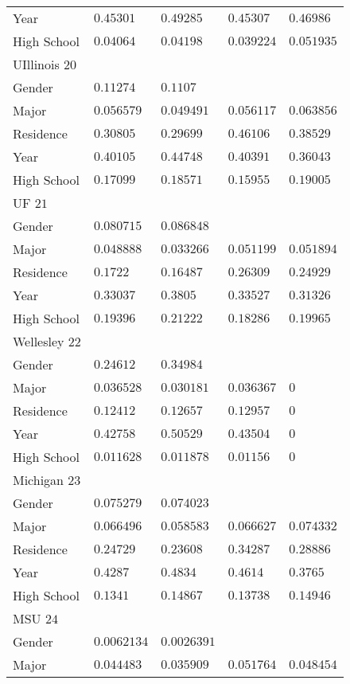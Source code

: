 \begin{center}
\begin{longtable}{|l|l|l|l|l|}
Year & $0.45301$ & $0.49285$ & $0.45307$ & $0.46986$ \\
High School & $0.04064$ & $0.04198$ & $0.039224$ & $0.051935$ \\ \hline \hline
UIllinois $20$ & & &   \\ \hline
Gender & $0.11274$ & $0.1107$ & & \\
Major & $0.056579$ & $0.049491$ & $0.056117$ & $0.063856$ \\
Residence & $0.30805$ & $0.29699$ & $0.46106$ & $0.38529$ \\
Year & $0.40105$ & $0.44748$ & $0.40391$ & $0.36043$ \\
High School & $0.17099$ & $0.18571$ & $0.15955$ & $0.19005$ \\ \hline \hline
UF $21$ & & &   \\ \hline
Gender & $0.080715$ & $0.086848$ & & \\
Major & $0.048888$ & $0.033266$ & $0.051199$ & $0.051894$ \\
Residence & $0.1722$ & $0.16487$ & $0.26309$ & $0.24929$ \\
Year & $0.33037$ & $0.3805$ & $0.33527$ & $0.31326$ \\
High School & $0.19396$ & $0.21222$ & $0.18286$ & $0.19965$ \\ \hline \hline
Wellesley $22$ & & &   \\ \hline
Gender & $0.24612$ & $0.34984$ & & \\
Major & $0.036528$ & $0.030181$ & $0.036367$ & $0$ \\
Residence & $0.12412$ & $0.12657$ & $0.12957$ & $0$ \\
Year & $0.42758$ & $0.50529$ & $0.43504$ & $0$ \\
High School & $0.011628$ & $0.011878$ & $0.01156$ & $0$ \\ \hline \hline
Michigan $23$ & & &   \\ \hline
Gender & $0.075279$ & $0.074023$ & & \\
Major & $0.066496$ & $0.058583$ & $0.066627$ & $0.074332$ \\
Residence & $0.24729$ & $0.23608$ & $0.34287$ & $0.28886$ \\
Year & $0.4287$ & $0.4834$ & $0.4614$ & $0.3765$ \\
High School & $0.1341$ & $0.14867$ & $0.13738$ & $0.14946$ \\ \hline \hline
MSU $24$ & & &   \\ \hline
Gender & $0.0062134$ & $0.0026391$ & & \\
Major & $0.044483$ & $0.035909$ & $0.051764$ & $0.048454$ \\

\end{longtable}
\end{center}
